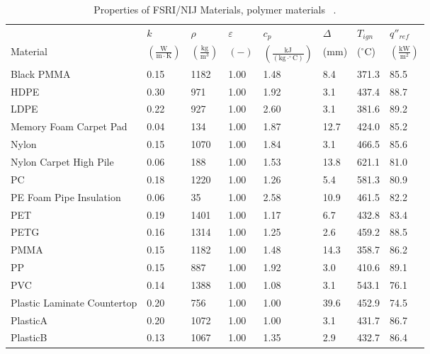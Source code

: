 \clearpage

\begin{table}[!h]
\caption[Properties of FSRI/NIJ Materials, polymer materials]{Properties of FSRI/NIJ Materials, polymer materials ~\cite{McKinnon:FSRI2023_Data}.}
\centering
\begin{tabular}{|p{5.5cm}|p{1.0cm}|p{1.0cm}|p{0.8cm}|p{1.4cm}|p{1.0cm}|p{1.0cm}|p{1.2cm}|}
\hline
                                               & $k$    & $\rho$      & $\varepsilon$   & $c_{p}$ & $\Delta$    & $T_{ign}$ & $q''_{ref}$ \\
Material                                       & $\mathrm{\left(\frac{W}{m\cdot K}\right)}$ & $\mathrm{\left(\frac{kg}{m^{3}}\right)}$ & $\mathrm{( - )}$ & $\mathrm{\left(\frac{kJ}{(kg\cdot ^{\circ}C)}\right)}$ &  ($\mathrm{mm}$)   & ($\mathrm{^{\circ}C}$) & $\mathrm{\left(\frac{kW}{m^{2}}\right)}$ \\ \hline
\hline
Black PMMA & 0.15 & 1182 & 1.00 & 1.48 & 8.4 & 371.3 & 85.5 \\ \hline
HDPE & 0.30 & 971 & 1.00 & 1.92 & 3.1 & 437.4 & 88.7 \\ \hline
LDPE & 0.22 & 927 & 1.00 & 2.60 & 3.1 & 381.6 & 89.2 \\ \hline
Memory Foam Carpet Pad & 0.04 & 134 & 1.00 & 1.87 & 12.7 & 424.0 & 85.2 \\ \hline
Nylon & 0.15 & 1070 & 1.00 & 1.84 & 3.1 & 466.5 & 85.6 \\ \hline
Nylon Carpet High Pile & 0.06 & 188 & 1.00 & 1.53 & 13.8 & 621.1 & 81.0 \\ \hline
PC & 0.18 & 1220 & 1.00 & 1.26 & 5.4 & 581.3 & 80.9 \\ \hline
PE Foam Pipe Insulation & 0.06 & 35 & 1.00 & 2.58 & 10.9 & 461.5 & 82.2 \\ \hline
PET & 0.19 & 1401 & 1.00 & 1.17 & 6.7 & 432.8 & 83.4 \\ \hline
PETG & 0.16 & 1314 & 1.00 & 1.25 & 2.6 & 459.2 & 88.5 \\ \hline
PMMA & 0.15 & 1182 & 1.00 & 1.48 & 14.3 & 358.7 & 86.2 \\ \hline
PP & 0.15 & 887 & 1.00 & 1.92 & 3.0 & 410.6 & 89.1 \\ \hline
PVC & 0.14 & 1388 & 1.00 & 1.08 & 3.1 & 543.1 & 76.1 \\ \hline
Plastic Laminate Countertop & 0.20 & 756 & 1.00 & 1.00 & 39.6 & 452.9 & 74.5 \\ \hline
PlasticA & 0.20 & 1072 & 1.00 & 1.00 & 3.1 & 431.7 & 86.7 \\ \hline
PlasticB & 0.13 & 1067 & 1.00 & 1.35 & 2.9 & 432.7 & 86.4 \\ \hline

\end{tabular}
\end{table}
